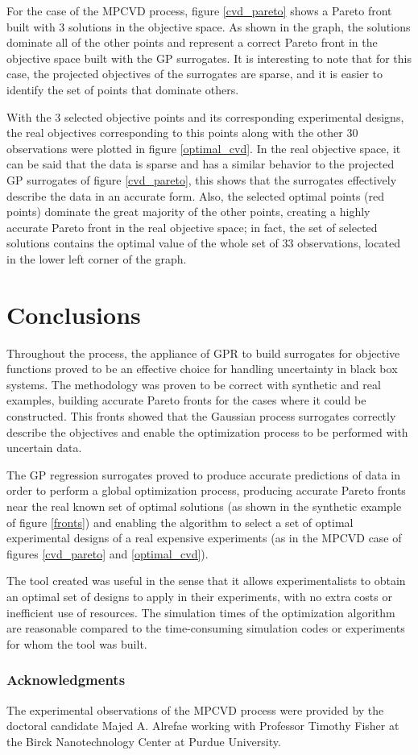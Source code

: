 \documentclass{article}
\begin{document}
For the case of the MPCVD process, figure \ref{cvd_pareto} shows a Pareto front built with 3 solutions in the objective space. As shown in the graph, the solutions dominate all of the other points and represent a correct Pareto front in the objective space built with the GP surrogates. It is interesting to note that for this case, the projected objectives of the surrogates are sparse, and it is easier to identify the set of points that dominate others.

With the 3 selected objective points and its corresponding experimental designs, the real objectives corresponding to this points along with the other 30 observations were plotted in figure \ref{optimal_cvd}. In the real objective space, it can be said that the data is sparse and has a similar behavior to the projected GP surrogates of figure \ref{cvd_pareto}, this shows that the surrogates effectively describe the data in an accurate form. Also, the selected optimal points (red points) dominate the great majority of the other points, creating a highly accurate Pareto front in the real objective space; in fact, the set of selected solutions contains the optimal value of the whole set of 33 observations, located in the lower left corner of the graph.

\section{Conclusions}

Throughout the process, the appliance of GPR to build surrogates for objective functions proved to be an effective choice for handling uncertainty in black box systems. The methodology was proven to be correct with synthetic and real examples, building accurate Pareto fronts for the cases where it could be constructed. This fronts showed that the Gaussian process surrogates correctly describe the objectives and enable the optimization process to be performed with uncertain data.

The GP regression surrogates proved to produce accurate predictions of data in order to perform a global optimization process, producing accurate Pareto fronts near the real known set of optimal solutions (as shown in the synthetic example of figure \ref{fronts}) and enabling the algorithm to select a set of optimal experimental designs of a real expensive experiments (as in the MPCVD case of figures \ref{cvd_pareto} and \ref{optimal_cvd}).

The tool created was useful in the sense that it allows experimentalists to obtain an optimal set of designs to apply in their experiments, with no extra costs or inefficient use of resources. The simulation times of the optimization algorithm are reasonable compared to the time-consuming simulation codes or experiments for whom the tool was built.

\subsubsection*{Acknowledgments}
The experimental observations of the MPCVD process were provided by the doctoral candidate Majed A. Alrefae working with Professor Timothy Fisher at the Birck Nanotechnology Center at Purdue University.



\end{document}
